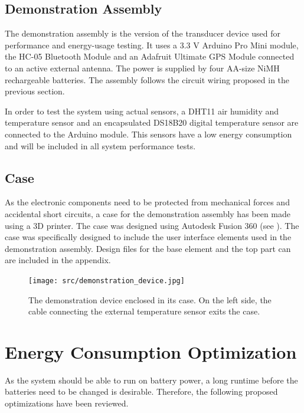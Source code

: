 \subsection{Demonstration Assembly}
The demonstration assembly is the version of the transducer device used for performance and energy-usage testing. It uses a 3.3 V Arduino Pro Mini module, the HC-05 Bluetooth Module and an Adafruit Ultimate GPS Module connected to an active external antenna. The power is supplied by four AA-size NiMH rechargeable batteries. The assembly follows the circuit wiring proposed in the previous section.

In order to test the system using actual sensors, a DHT11 air humidity and temperature sensor and an encapsulated DS18B20 digital temperature sensor are connected to the Arduino module. This sensors have a low energy consumption and will be included in all system performance tests.

\subsection{Case}
As the electronic components need to be protected from mechanical forces and accidental short circuits, a case for the demonstration assembly has been made using a 3D printer. The case was designed using Autodesk Fusion 360 (see \cite{f360}). The case was specifically designed to include the user interface elements used in the demonstration assembly. Design files for the base element and the top part can are included in the appendix. 

\begin{figure}[h]
\centering
\texttt{[image: src/demonstration\_device.jpg]}
\caption{The demonstration device enclosed in its case. On the left side, the cable connecting the external temperature sensor exits the case.}
\label{fig:demonstration_device}
\end{figure}

\section{Energy Consumption Optimization}
As the system should be able to run on battery power, a long runtime before the batteries need to be changed is desirable. Therefore, the following proposed optimizations have been reviewed.

